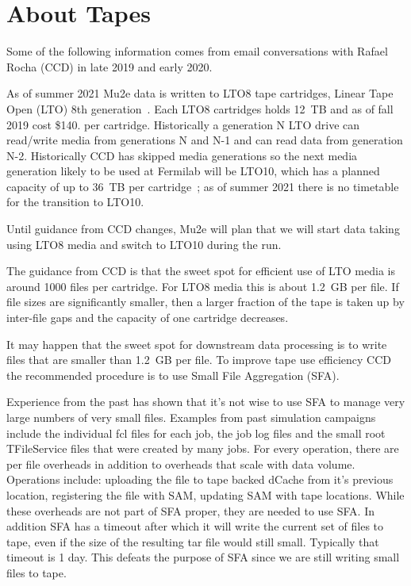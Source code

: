 \chapter{About Tapes}
\label{app:AboutTapes}

Some of the following information comes from email conversations with
Rafael Rocha (CCD) in late 2019 and early 2020.

As of summer 2021 Mu2e data is written to LTO8 tape cartridges,
Linear Tape Open (LTO) 8th generation~\cite{LTO}.
Each LTO8 cartridges holds 12~TB and as of fall 2019 cost \$140. per cartridge.
Historically a generation N LTO drive can read/write media from generations N and N-1
and can read data from generation N-2.
Historically CCD has skipped media generations so the next
media generation likely to be used at Fermilab will be LTO10,
which has a planned capacity of up to 36~TB per cartridge~\cite{LTORoadmap};
as of summer 2021 there is no timetable for the transition to LTO10.

Until guidance from CCD changes, Mu2e will plan that we will start
data taking using LTO8 media and switch to LTO10 during the run.

The guidance from CCD is that the sweet spot for efficient use of LTO media
is around 1000 files per cartridge.  For LTO8 media this is about 1.2~GB per file.
If file sizes are significantly smaller,
then a larger fraction of the tape is taken up by inter-file gaps
and the capacity of one cartridge decreases.

It may happen that the sweet spot for downstream data processing is to
write files that are smaller than 1.2~GB per file.
To improve tape use efficiency CCD the recommended procedure is to use Small File Aggregation (SFA).

Experience from the past has shown that it's not wise to use SFA to manage
very large numbers of very small files.  Examples from past simulation campaigns
include the individual fcl files for each job, the job log files
and the small root TFileService files that were created by many jobs.
For every operation, there are per file overheads in addition to overheads
that scale with data volume.  Operations include: uploading the file
to tape backed dCache from it's previous location, registering the file
with SAM, updating SAM with tape locations.  While these overheads
are not part of SFA proper, they are needed to use SFA.
In addition SFA has a timeout after which it will write the current set of files to
tape, even if the size of the resulting tar file would still small.
Typically that timeout is 1 day.
This defeats the purpose of SFA since we are still writing small files to tape.

